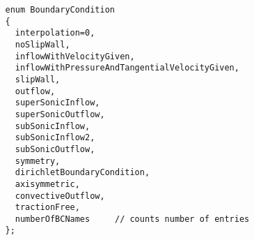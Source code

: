 
 
\newlength{\OverBlownBoundaryConditionsIncludeArgIndent}
 {\footnotesize
 \begin{verbatim}
   enum BoundaryCondition
   {
     interpolation=0,
     noSlipWall,
     inflowWithVelocityGiven,
     inflowWithPressureAndTangentialVelocityGiven,
     slipWall,
     outflow,
     superSonicInflow,
     superSonicOutflow,
     subSonicInflow,
     subSonicInflow2,
     subSonicOutflow,
     symmetry,
     dirichletBoundaryCondition,
     axisymmetric,
     convectiveOutflow,
     tractionFree,
     numberOfBCNames     // counts number of entries
   };
 \end{verbatim}
 }
